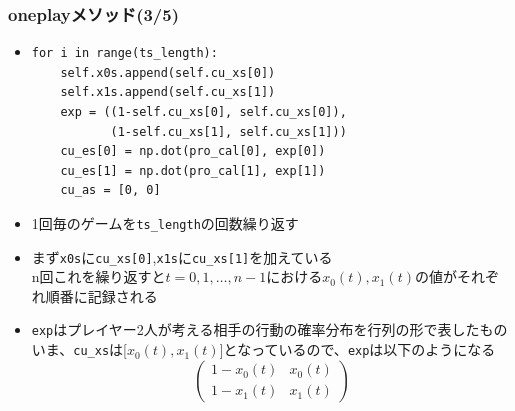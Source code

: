 \documentclass[dvipdfmx,fleqn,handout]{beamer}
\begin{document}
\begin{frame}[fragile]%
\frametitle{oneplayメソッド(3/5)}
\begin{itemize}\setlength{\parskip}{0.5em}
\item
\footnotesize
\begin{verbatim}   
for i in range(ts_length):
    self.x0s.append(self.cu_xs[0])
    self.x1s.append(self.cu_xs[1])
    exp = ((1-self.cu_xs[0], self.cu_xs[0]),
           (1-self.cu_xs[1], self.cu_xs[1]))
    cu_es[0] = np.dot(pro_cal[0], exp[0])
    cu_es[1] = np.dot(pro_cal[1], exp[1])
    cu_as = [0, 0]
\end{verbatim}\pause
\normalsize
\item
1回毎のゲームを\verb|ts_length|の回数繰り返す\pause
\item
まず\verb|x0s|に\verb|cu_xs[0]|,\verb|x1s|に\verb|cu_xs[1]|を加えている\pause
\\n回これを繰り返すと$t=0,1,\dots,n-1$における$x_0(t),x_1(t)$の値がそれぞれ順番に記録される
\item
\verb|exp|はプレイヤー2人が考える相手の行動の確率分布を行列の形で表したもの\pause\\
いま、\verb|cu_xs|は[$x_0(t),x_1(t)$]となっているので、\verb|exp|は以下のようになる\pause
\footnotesize
\begin{equation*}
\begin{pmatrix}
1-x_0(t) & x_0(t)\\
1-x_1(t) & x_1(t)
\end{pmatrix}
\end{equation*}
\normalsize
\end{itemize}
\end{frame}
\end{document}
